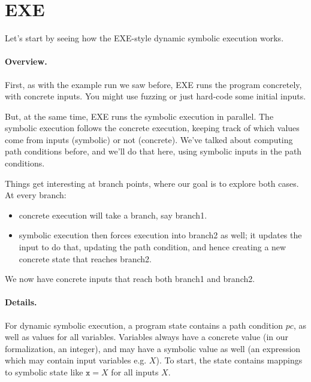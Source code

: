 \documentclass[11pt]{article}
\begin{document}
\section{EXE}
Let's start by seeing how the EXE-style dynamic symbolic execution works.

\paragraph{Overview.} First, as with the example run we saw before, EXE runs the program concretely, with concrete inputs. You might use fuzzing
or just hard-code some initial inputs.

But, at the same time, EXE runs the symbolic execution in parallel. The symbolic execution follows the concrete execution,
keeping track of which values come from inputs (symbolic) or not (concrete). We've talked about computing path conditions
before, and we'll do that here, using symbolic inputs in the path conditions.

Things get interesting at branch points, where our goal is to explore both cases. At every branch:
\begin{itemize}[noitemsep]
\item concrete execution will take a branch, say branch1.
\item symbolic execution then forces execution into branch2 as well; it updates the input to do that, updating the path condition, and hence creating a new concrete state that reaches branch2.
\end{itemize}
We now have concrete inputs that reach both branch1 and branch2.

\paragraph{Details.} For dynamic symbolic execution, a program state contains a path condition $\mathit{pc}$, as well as values for all variables.
Variables always have a concrete value (in our formalization, an integer), and may have a symbolic value as well (an expression which may contain
input variables e.g. $X$). To start, the state contains mappings to symbolic state like $\mathtt{x}=X$ for all inputs $X$.
\end{document}

